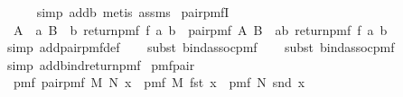 \begin{isabellebody}
\ \ \ \ \isamarkupfalse%
\ {\isacharparenleft}{\kern0pt}simp\ add{\isacharcolon}{\kern0pt}b{\isacharcomma}{\kern0pt}\ metis\ assms{\isacharparenleft}{\kern0pt}{}{\isacharparenright}{\kern0pt}{\isacharparenright}{\kern0pt}\isanewline
{}\isamarkupfalse%
%
\endisatagproof
{\isafoldproof}%
%
\isadelimproof
\isanewline
%
\endisadelimproof
\isanewline
{}\isamarkupfalse%
\ pair{\isacharunderscore}{\kern0pt}pmfI{\isacharcolon}{\kern0pt}\isanewline
\ \ {\isachardoublequoteopen}A\ {\isasymbind}\ {\isacharparenleft}{\kern0pt}{\isasymlambda}a{\isachardot}{\kern0pt}\ B\ {\isasymbind}\ {\isacharparenleft}{\kern0pt}{\isasymlambda}b{\isachardot}{\kern0pt}\ return{\isacharunderscore}{\kern0pt}pmf\ {\isacharparenleft}{\kern0pt}f\ a\ b{\isacharparenright}{\kern0pt}{\isacharparenright}{\kern0pt}{\isacharparenright}{\kern0pt}\ {\isacharequal}{\kern0pt}\ pair{\isacharunderscore}{\kern0pt}pmf\ A\ B\ {\isasymbind}\ {\isacharparenleft}{\kern0pt}{\isasymlambda}{\isacharparenleft}{\kern0pt}a{\isacharcomma}{\kern0pt}b{\isacharparenright}{\kern0pt}{\isachardot}{\kern0pt}\ return{\isacharunderscore}{\kern0pt}pmf\ {\isacharparenleft}{\kern0pt}f\ a\ b{\isacharparenright}{\kern0pt}{\isacharparenright}{\kern0pt}{\isachardoublequoteclose}\isanewline
%
\isadelimproof
\ \ %
\endisadelimproof
%
\isatagproof
{}\isamarkupfalse%
\ {\isacharparenleft}{\kern0pt}simp\ add{\isacharcolon}{\kern0pt}pair{\isacharunderscore}{\kern0pt}pmf{\isacharunderscore}{\kern0pt}def{\isacharparenright}{\kern0pt}\isanewline
\ \ \isamarkupfalse%
\ {\isacharparenleft}{\kern0pt}subst\ bind{\isacharunderscore}{\kern0pt}assoc{\isacharunderscore}{\kern0pt}pmf{\isacharparenright}{\kern0pt}\isanewline
\ \ \isamarkupfalse%
\ {\isacharparenleft}{\kern0pt}subst\ bind{\isacharunderscore}{\kern0pt}assoc{\isacharunderscore}{\kern0pt}pmf{\isacharparenright}{\kern0pt}\isanewline
\ \ \isamarkupfalse%
\ {\isacharparenleft}{\kern0pt}simp\ add{\isacharcolon}{\kern0pt}bind{\isacharunderscore}{\kern0pt}return{\isacharunderscore}{\kern0pt}pmf{\isacharparenright}{\kern0pt}%
\endisatagproof
{\isafoldproof}%
%
\isadelimproof
\isanewline
%
\endisadelimproof
\isanewline
{}\isamarkupfalse%
\ pmf{\isacharunderscore}{\kern0pt}pair{\isacharprime}{\kern0pt}{\isacharcolon}{\kern0pt}\isanewline
\ \ {\isachardoublequoteopen}pmf\ {\isacharparenleft}{\kern0pt}pair{\isacharunderscore}{\kern0pt}pmf\ M\ N{\isacharparenright}{\kern0pt}\ x\ {\isacharequal}{\kern0pt}\ pmf\ M\ {\isacharparenleft}{\kern0pt}fst\ x{\isacharparenright}{\kern0pt}\ {\isacharasterisk}{\kern0pt}\ pmf\ N\ {\isacharparenleft}{\kern0pt}snd\ x{\isacharparenright}{\kern0pt}{\isachardoublequoteclose}\isanewline

\end{isabellebody}
